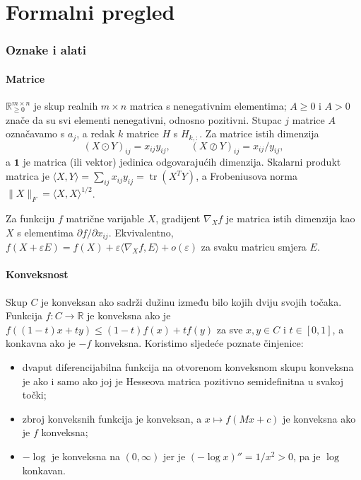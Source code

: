 \documentclass[11pt,a4paper]{article}
\theoremstyle{definition}
\theoremstyle{plain}
\theoremstyle{remark}
\newcommand{\R}{\mathbb{R}}
\newcommand{\Rp}{\mathbb{R}_{\geq 0}}
\newcommand{\one}{\mathbf{1}}
\begin{document}
\part{Formalni pregled}

\section{Oznake i alati}\label{sec:f-oznake}

\subsection{Matrice}

$\Rp^{m\times n}$ je skup realnih $m\times n$ matrica s nenegativnim elementima; $A\geq0$ i $A>0$
znače da su svi elementi nenegativni, odnosno pozitivni. Stupac $j$ matrice $A$ označavamo s
$a_j$, a redak $k$ matrice $H$ s $H_{k,:}$. Za matrice istih dimenzija
\[
  (X\odot Y)_{ij}=x_{ij}y_{ij},\qquad (X\oslash Y)_{ij}=x_{ij}/y_{ij},
\]
a $\one$ je matrica (ili vektor) jedinica odgovarajućih dimenzija. Skalarni produkt matrica je
$\langle X,Y\rangle=\sum_{ij}x_{ij}y_{ij}=\operatorname{tr}(X^TY)$, a Frobeniusova norma
$\|X\|_F=\langle X,X\rangle^{1/2}$.

Za funkciju $f$ matrične varijable $X$, gradijent $\nabla_X f$ je matrica istih dimenzija kao $X$
s elementima $\partial f/\partial x_{ij}$. Ekvivalentno, $f(X+\varepsilon E)=f(X)+\varepsilon\langle
\nabla_X f, E\rangle+o(\varepsilon)$ za svaku matricu smjera $E$.

\subsection{Konveksnost}

Skup $C$ je konveksan ako sadrži dužinu između bilo kojih dviju svojih točaka. Funkcija
$f\colon C\to\R$ je konveksna ako je $f((1-t)x+ty)\leq(1-t)f(x)+tf(y)$ za sve $x,y\in C$ i
$t\in[0,1]$, a konkavna ako je $-f$ konveksna. Koristimo sljedeće poznate činjenice:
\begin{itemize}
\item dvaput diferencijabilna funkcija na otvorenom konveksnom skupu konveksna je ako i samo ako joj
  je Hesseova matrica pozitivno semidefinitna u svakoj točki;
\item zbroj konveksnih funkcija je konveksan, a $x\mapsto f(Mx+c)$ je konveksna ako je $f$ konveksna;
\item $-\log$ je konveksna na $(0,\infty)$ jer je $(-\log x)''=1/x^2>0$, pa je $\log$ konkavan.
\end{itemize}
\end{document}
